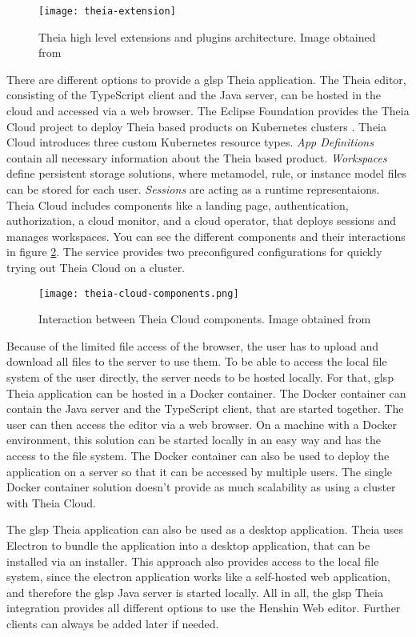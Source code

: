   \begin{figure}[h]
    \centering
    \texttt{[image: theia-extension]}
    \caption{Theia high level extensions and plugins architecture. Image obtained from \cite{theia-doc}}
    \label{fig:theia-extensions}
  \end{figure}

  There are different options to provide a \ac{glsp} Theia application. The Theia editor, consisting of the TypeScript client and the Java server, can be hosted in the cloud and accessed via a web browser. The Eclipse Foundation provides the Theia Cloud project \cite{theia-cloud-doc} to deploy Theia based products on Kubernetes clusters \cite{kubernetes}. Theia Cloud introduces three custom Kubernetes resource types. \textit{App Definitions} contain all necessary information about the Theia based product. \textit{Workspaces} define persistent storage solutions, where metamodel, rule, or instance model files can be stored for each user. \textit{Sessions} are acting as a runtime representaions. Theia Cloud includes components like a landing page, authentication, authorization, a cloud monitor, and a cloud operator, that deploys sessions and manages workspaces. You can see the different components and their interactions in figure \ref{fig:theia-cloud-components}. The service provides two preconfigured configurations for quickly trying out Theia Cloud on a cluster. \cite{theia-cloud-doc}

  \begin{figure}[h]
    \centering
    \texttt{[image: theia-cloud-components.png]}
    \caption{Interaction between Theia Cloud components. Image obtained from \cite{theia-cloud-doc}}
    \label{fig:theia-cloud-components}
  \end{figure}

  Because of the limited file access of the browser, the user has to upload and download all files to the server to use them. To be able to access the local file system of the user directly, the server needs to be hosted locally. For that, \ac{glsp} Theia application can be hosted in a Docker container. \cite{docker} The Docker container can contain the Java server and the TypeScript client, that are started together. The user can then access the editor via a web browser. On a machine with a Docker environment, this solution can be started locally in an easy way and has the access to the file system. The Docker container can also be used to deploy the application on a server so that it can be accessed by multiple users. The single Docker container solution doesn't provide as much scalability as using a cluster with Theia Cloud.

  The \ac{glsp} Theia application can also be used as a desktop application. Theia uses Electron \cite{electron-repo} to bundle the application into a desktop application, that can be installed via an installer. This approach also provides access to the local file system, since the electron application works like a self-hosted web application, and therefore the \ac{glsp} Java server is started locally. All in all, the \ac{glsp} Theia integration provides all different options to use the Henshin Web editor. Further clients can always be added later if needed.